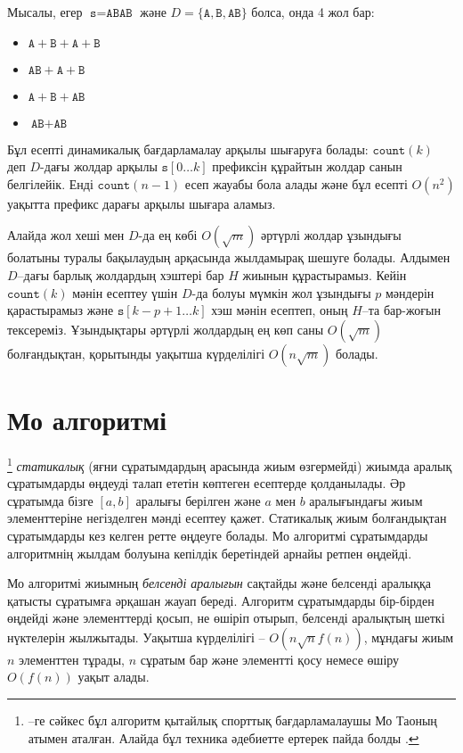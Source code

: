 Мысалы,
егер $\texttt{s}=\texttt{ABAB}$ және
$D=\{\texttt{A},\texttt{B},\texttt{AB}\}$ болса,
онда 4 жол бар:

\begin{itemize}[noitemsep]
\item $\texttt{A}+\texttt{B}+\texttt{A}+\texttt{B}$
\item $\texttt{AB}+\texttt{A}+\texttt{B}$
\item $\texttt{A}+\texttt{B}+\texttt{AB}$
\item $\texttt{AB}+\texttt{AB}$
\end{itemize}

Бұл есепті динамикалық бағдарламалау арқылы шығаруға болады:
$\texttt{count}(k)$ деп $D$-дағы жолдар арқылы 
$\texttt{s}[0 \ldots k]$ префиксін құрайтын жолдар 
санын белгілейік. Енді $\texttt{count}(n-1)$ 
есеп жауабы бола алады және бұл есепті $O(n^2)$ уақытта
префикс дарағы арқылы шығара аламыз. 

Алайда жол хеші мен $D$-да ең көбі 
$O(\sqrt m)$ әртүрлі жолдар ұзындығы болатыны туралы бақылаудың 
арқасында жылдамырақ шешуге болады. Алдымен $D$–дағы барлық
жолдардың хэштері бар $H$ жиынын құрастырамыз.
Кейін $\texttt{count}(k)$ мәнін есептеу үшін
$D$-да болуы мүмкін жол ұзындығы $p$ мәндерін қарастырамыз және
$\texttt{s}[k-p+1 \ldots k]$ хэш мәнін есептеп,
оның $H$–та бар-жоғын тексереміз. Ұзындықтары әртүрлі
жолдардың ең көп саны $O(\sqrt m)$ болғандықтан,
қорытынды уақытша күрделілігі $O(n \sqrt m)$ болады.

\section{Мо алгоритмі}


\footnote{\cite{cod15}–ге сәйкес бұл алгоритм қытайлық
спорттық бағдарламалаушы Мо Таоның атымен аталған. Алайда 
бұл техника әдебиетте ертерек пайда болды \cite{ken06}.}
\emph{статикалық} (яғни сұратымдардың арасында жиым өзгермейді)
жиымда аралық сұратымдарды өңдеуді талап ететін
көптеген есептерде қолданылады. Әр сұратымда бізге 
$[a,b]$ аралығы берілген және $a$ мен $b$ аралығындағы 
жиым элементтеріне негізделген мәнді есептеу қажет. 
Статикалық жиым болғандықтан сұратымдарды кез келген
ретте өңдеуге болады. Мо алгоритмі сұратымдарды алгоритмнің жылдам болуына кепілдік беретіндей арнайы ретпен өңдейді. 

Мо алгоритмі жиымның \emph{белсенді аралығын} сақтайды
және белсенді аралыққа қатысты сұратымға әрқашан жауап береді.
Алгоритм сұратымдарды бір-бірден өңдейді және
элементтерді қосып, не өшіріп отырып, 
белсенді аралықтың шеткі нүктелерін жылжытады. 
Уақытша күрделілігі -- $O(n \sqrt n f(n))$,
мұндағы жиым $n$ элементтен тұрады, $n$ сұратым бар және
элементті қосу немесе өшіру $O(f(n))$ уақыт алады. 


